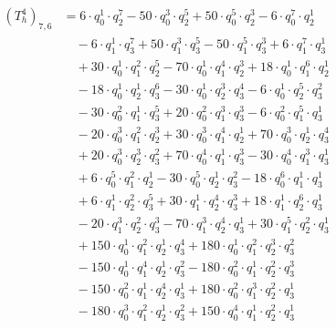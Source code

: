\begin{align*}(T_{h}^4)_{7,6}&=6\cdot q_0^{1}\cdot q_2^{7}-50\cdot q_0^{3}\cdot q_2^{5}+50\cdot q_0^{5}\cdot q_2^{3}-6\cdot q_0^{7}\cdot q_2^{1}\\
&\quad -6\cdot q_1^{1}\cdot q_3^{7}+50\cdot q_1^{3}\cdot q_3^{5}-50\cdot q_1^{5}\cdot q_3^{3}+6\cdot q_1^{7}\cdot q_3^{1}\\
&\quad +30\cdot q_0^{1}\cdot q_1^{2}\cdot q_2^{5}-70\cdot q_0^{1}\cdot q_1^{4}\cdot q_2^{3}+18\cdot q_0^{1}\cdot q_1^{6}\cdot q_2^{1}\\
&\quad -18\cdot q_0^{1}\cdot q_2^{1}\cdot q_3^{6}-30\cdot q_0^{1}\cdot q_2^{3}\cdot q_3^{4}-6\cdot q_0^{1}\cdot q_2^{5}\cdot q_3^{2}\\
&\quad -30\cdot q_0^{2}\cdot q_1^{1}\cdot q_3^{5}+20\cdot q_0^{2}\cdot q_1^{3}\cdot q_3^{3}-6\cdot q_0^{2}\cdot q_1^{5}\cdot q_3^{1}\\
&\quad -20\cdot q_0^{3}\cdot q_1^{2}\cdot q_2^{3}+30\cdot q_0^{3}\cdot q_1^{4}\cdot q_2^{1}+70\cdot q_0^{3}\cdot q_2^{1}\cdot q_3^{4}\\
&\quad +20\cdot q_0^{3}\cdot q_2^{3}\cdot q_3^{2}+70\cdot q_0^{4}\cdot q_1^{1}\cdot q_3^{3}-30\cdot q_0^{4}\cdot q_1^{3}\cdot q_3^{1}\\
&\quad +6\cdot q_0^{5}\cdot q_1^{2}\cdot q_2^{1}-30\cdot q_0^{5}\cdot q_2^{1}\cdot q_3^{2}-18\cdot q_0^{6}\cdot q_1^{1}\cdot q_3^{1}\\
&\quad +6\cdot q_1^{1}\cdot q_2^{2}\cdot q_3^{5}+30\cdot q_1^{1}\cdot q_2^{4}\cdot q_3^{3}+18\cdot q_1^{1}\cdot q_2^{6}\cdot q_3^{1}\\
&\quad -20\cdot q_1^{3}\cdot q_2^{2}\cdot q_3^{3}-70\cdot q_1^{3}\cdot q_2^{4}\cdot q_3^{1}+30\cdot q_1^{5}\cdot q_2^{2}\cdot q_3^{1}\\
&\quad +150\cdot q_0^{1}\cdot q_1^{2}\cdot q_2^{1}\cdot q_3^{4}+180\cdot q_0^{1}\cdot q_1^{2}\cdot q_2^{3}\cdot q_3^{2}\\
&\quad -150\cdot q_0^{1}\cdot q_1^{4}\cdot q_2^{1}\cdot q_3^{2}-180\cdot q_0^{2}\cdot q_1^{1}\cdot q_2^{2}\cdot q_3^{3}\\
&\quad -150\cdot q_0^{2}\cdot q_1^{1}\cdot q_2^{4}\cdot q_3^{1}+180\cdot q_0^{2}\cdot q_1^{3}\cdot q_2^{2}\cdot q_3^{1}\\
&\quad -180\cdot q_0^{3}\cdot q_1^{2}\cdot q_2^{1}\cdot q_3^{2}+150\cdot q_0^{4}\cdot q_1^{1}\cdot q_2^{2}\cdot q_3^{1}\end{align*}
